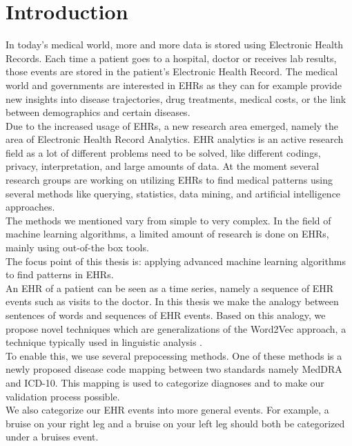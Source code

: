 \chapter{Introduction}
\label{cha:introduction}

In today's medical world, more and more data is stored using Electronic Health Records. Each time a patient goes to a hospital, doctor or receives lab results, those events are stored in the patient's Electronic Health Record. The medical world and governments are interested in EHRs as they can for example provide new insights into disease trajectories, drug treatments, medical costs, or the link between demographics and certain diseases. \\

Due to the increased usage of EHRs, a new research area emerged, namely the area of Electronic Health Record Analytics. EHR analytics is an active research field as a lot of different problems need to be solved, like different codings, privacy, interpretation, and large amounts of data. At the moment several research groups are working on utilizing EHRs to find medical patterns using several methods like querying, statistics, data mining, and artificial intelligence approaches. \\
The methods we mentioned vary from simple to very complex. In the field of machine learning algorithms, a limited amount of research is done on EHRs, mainly using out-of-the box tools. \\
The focus point of this thesis is: applying advanced machine learning algorithms to find patterns in EHRs. \\

An EHR of a patient can be seen as a time series, namely a sequence of EHR events such as visits to the doctor. In this thesis we make the analogy between sentences of words and sequences of EHR events. Based on this analogy, we propose novel techniques which are generalizations of the Word2Vec approach, a technique typically used in linguistic analysis \cite{w2vOriginal:article}. \\
To enable this, we use several prepocessing methods. One of these methods is a newly proposed disease code mapping between two standards namely MedDRA and ICD-10. This mapping is used to categorize diagnoses and to make our validation process possible.\\ 
We also categorize our EHR events into more general events. For example, a bruise on your right leg and a bruise on your left leg should both be categorized under a bruises event. \\

